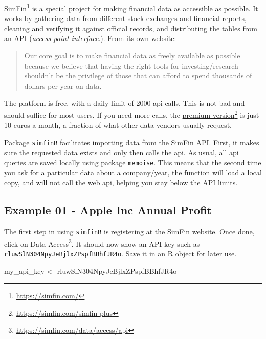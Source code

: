 \documentclass[
  12pt,
]{book}
\newenvironment{Shaded}{\begin{snugshade}}{\end{snugshade}}
\newcommand{\NormalTok}[1]{#1}
\newcommand{\OtherTok}[1]{\textcolor[rgb]{0.37,0.37,0.37}{#1}}
\newcommand{\StringTok}[1]{\textcolor[rgb]{0.5,0.5,0.5}{#1}}
\begin{document}
\href{https://simfin.com/}{SimFin}\footnote{\url{https://simfin.com/}} is a special project for making financial data as accessible as possible. It works by gathering data from different stock exchanges and financial reports, cleaning and verifying it against official records, and distributing the tables from an API (\emph{access point interface}.). From its own website:

\begin{quote}
Our core goal is to make financial data as freely available as possible because we believe that having the right tools for investing/research shouldn't be the privilege of those that can afford to spend thousands of dollars per year on data.
\end{quote}

The platform is free, with a daily limit of 2000 api calls. This is not bad and should suffice for most users. If you need more calls, the \href{https://simfin.com/simfin-plus}{premium version}\footnote{\url{https://simfin.com/simfin-plus}} is just 10 euros a month, a fraction of what other data vendors usually request.

Package \texttt{simfinR} facilitates importing data from the SimFin API. First, it makes sure the requested data exists and only then calls the api. As usual, all api queries are saved locally using package \texttt{memoise}. This means that the second time you ask for a particular data about a company/year, the function will load a local copy, and will not call the web api, helping you stay below the API limits.

\hypertarget{example-01---apple-inc-annual-profit}{%
\subsection{Example 01 - Apple Inc Annual Profit}\label{example-01---apple-inc-annual-profit}}

The first step in using \texttt{simfinR} is registering at the \href{https://simfin.com/}{SimFin website}. Once done, click on \href{https://simfin.com/data/access/api}{Data Access}\footnote{\url{https://simfin.com/data/access/api}}. It should now show an API key such as \texttt{\textquotesingle{}rluwSlN304NpyJeBjlxZPspfBBhfJR4o\textquotesingle{}}. Save it in an R object for later use.

\begin{Shaded}
\begin{Highlighting}[]
\NormalTok{my\_api\_key }\OtherTok{\textless{}{-}} \StringTok{\textquotesingle{}rluwSlN304NpyJeBjlxZPspfBBhfJR4o\textquotesingle{}}
\end{Highlighting}
\end{Shaded}
\end{document}

